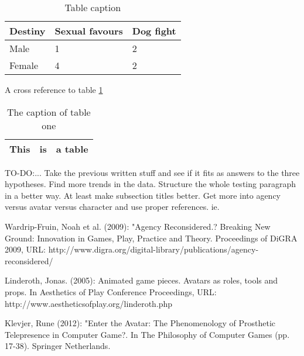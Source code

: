 \begin{table}[h]
\centering
\begin{tabular}{l l l}
\hline
\textbf{Destiny} & Sexual favours & Dog fight\\
\hline
Male & 1 & 2 \\
Female & 4 & 2 \\
\hline
\end{tabular}
\caption{Table caption}
\end{table}

A cross reference to table \ref{tab:one}
\begin{table}
\begin{tabular}{|c|c|c|}
\hline 
 This & is & a table \tabularnewline
\hline 
\end{tabular}
\caption{\label{tab:one}The caption of table one}
\end{table}



TO-DO:...
Take the previous written stuff and see if it fits as answers to the three hypotheses. Find more trends in the data. Structure the whole testing paragraph in a better way. At least make subsection titles better. Get more into agency versus avatar versus character and use proper references.
ie. 

Wardrip-Fruin, Noah et al. (2009): "Agency Reconsidered.? Breaking New Ground: Innovation in Games, Play, Practice and Theory. Proceedings of DiGRA 2009, URL: http://www.digra.org/digital-library/publications/agency-reconsidered/

Linderoth, Jonas. (2005): Animated game pieces. Avatars as roles, tools and props. In Aesthetics of Play Conference Proceedings, URL: http://www.aestheticsofplay.org/linderoth.php

Klevjer, Rune (2012): "Enter the Avatar: The Phenomenology of Prosthetic Telepresence in Computer Game?. In The Philosophy of Computer Games (pp. 17-38). Springer Netherlands.




